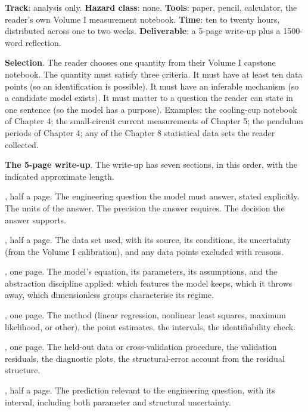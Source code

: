\begin{project}
\textbf{Track}: analysis only. \textbf{Hazard class}: none.
\textbf{Tools}: paper, pencil, calculator, the reader's own
Volume I measurement notebook. \textbf{Time}: ten to twenty
hours, distributed across one to two weeks. \textbf{Deliverable}:
a 5-page write-up plus a 1500-word reflection.

\smallskip
\textbf{Selection}. The reader chooses one quantity from their
Volume I capstone notebook. The quantity must satisfy three
criteria. It must have at least ten data points (so an
identification is possible). It must have an inferable
mechanism (so a candidate model exists). It must matter to a
question the reader can state in one sentence (so the model
has a purpose). Examples: the cooling-cup notebook of Chapter 4;
the small-circuit current measurements of Chapter 5; the
pendulum periods of Chapter 4; any of the Chapter 8 statistical
data sets the reader collected.

\smallskip
\textbf{The 5-page write-up}. The write-up has seven sections,
in this order, with the indicated approximate length.

, half a page. The engineering
question the model must answer, stated explicitly. The units of
the answer. The precision the answer requires. The decision the
answer supports.

, half a page. The data set used, with
its source, its conditions, its uncertainty (from the Volume I
calibration), and any data points excluded with reasons.

, one page. The model's
equation, its parameters, its assumptions, and the
abstraction discipline applied: which features the model
keeps, which it throws away, which dimensionless groups
characterise its regime.

, one page. The method
(linear regression, nonlinear least squares, maximum
likelihood, or other), the point estimates, the intervals, the
identifiability check.

, one page. The held-out data
or cross-validation procedure, the validation residuals, the
diagnostic plots, the structural-error account from the
residual structure.

, half a page. The prediction
relevant to the engineering question, with its interval,
including both parameter and structural uncertainty.


\end{project}

